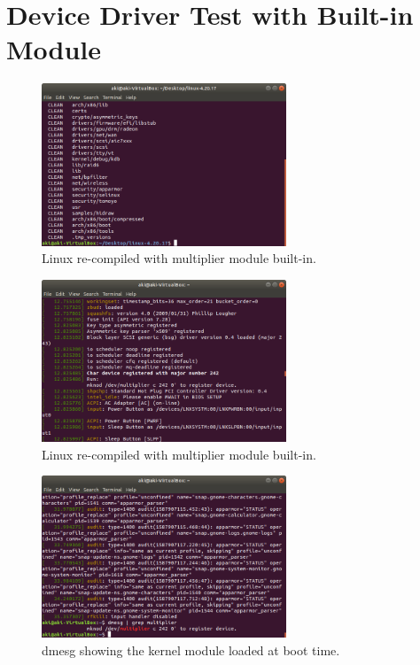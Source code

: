 \documentclass[11pt,letterpaper,titlepage]{article}
\begin{document}
\newpage

\section{Device Driver Test with Built-in Module}

\begin{figure}[ht]
    \centering
    \includegraphics[width=0.65\textwidth]{12.recompiled Linux.png}
    \caption{Linux re-compiled with multiplier module built-in.}
\end{figure}

\begin{figure}[ht]
    \centering
    \includegraphics[width=0.65\textwidth]{13.built-in multiplier.png}
    \caption{Linux re-compiled with multiplier module built-in.}
\end{figure}

\newpage

\begin{figure}[ht]
    \centering
    \includegraphics[width=0.65\textwidth]{14.multiplier dmesg.png}
    \caption{dmesg showing the kernel module loaded at boot time.}
\end{figure}
\end{document}
